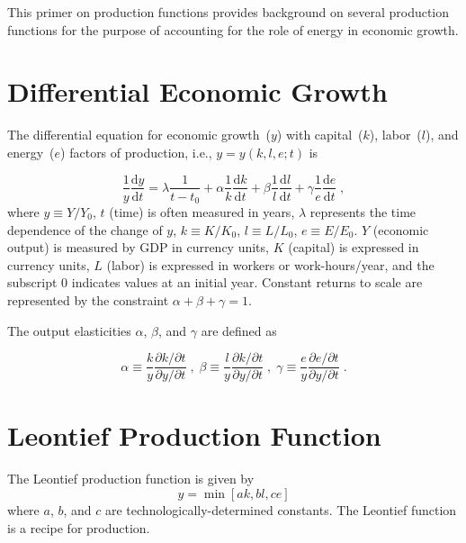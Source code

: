\documentclass[preprint,authoryear,12pt]{elsarticle}
\begin{document}
This primer on production functions 
provides background on several production functions
for the purpose of accounting for the role of energy
in economic growth.


\section{Differential Economic Growth} 
\label{sec:diff_growth}

The differential equation for economic growth~($y$) with 
capital~($k$), labor~($l$), and energy~($e$) factors of production, 
i.e., $y = y(k, l, e; t)$ is

\begin{equation} \label{eq:diff_growth}
  \frac{1}{y}\frac{\mathrm{d}y}{\mathrm{d}t} 
      = \lambda \frac{1}{t - t_0}
      + \alpha \frac{1}{k}\frac{\mathrm{d}k}{\mathrm{d}t} 
      + \beta \frac{1}{l}\frac{\mathrm{d}l}{\mathrm{d}t} 
      + \gamma \frac{1}{e}\frac{\mathrm{d}e}{\mathrm{d}t} \; ,
\end{equation}
%
where 
$y \equiv Y/Y_{0}$,
$t$ (time) is often measured in years,
$\lambda$ represents the time dependence of the change of $y$,
$k \equiv K/K_0$, 
$l \equiv L/L_0$, 
$e \equiv E/E_0$.
$Y$ (economic output) is measured by GDP in currency units, 
$K$ (capital) is expressed in currency units, 
$L$ (labor) is expressed in workers or work-hours/year, and
the subscript 0 indicates values at an initial year.
Constant returns to scale are represented by the constraint
$\alpha + \beta + \gamma = 1$. 

The output elasticities $\alpha$, $\beta$, and $\gamma$ are defined as

\begin{equation} \label{eq:alaph_def}
  \alpha \equiv \frac{k}{y} \frac{\partial k / \partial t}{\partial y / \partial t} \; , \;
  \beta  \equiv \frac{l}{y} \frac{\partial k / \partial t}{\partial y / \partial t} \; , \;
  \gamma \equiv \frac{e}{y} \frac{\partial e / \partial t}{\partial y / \partial t} \; .
\end{equation}


\section{Leontief Production Function} 
\label{sec:Leontief}

The Leontief production function is given by 
%
\begin{equation} \label{eq:Leontief}
  y = \min \left[ a k, b l, c e\right]
\end{equation}
%
where $a$, $b$, and $c$ are technologically-determined constants. 
The Leontief function is a recipe for production.
\end{document}
